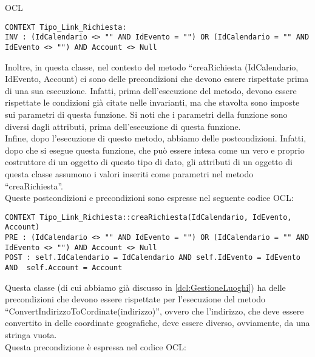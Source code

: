 \begin{listaPersonale}{OCL}
    \begin{lstlisting}
CONTEXT Tipo_Link_Richiesta:
INV : (IdCalendario <> "" AND IdEvento = "") OR (IdCalendario = "" AND IdEvento <> "") AND Account <> Null
    \end{lstlisting}
    Inoltre, in questa classe, nel contesto del metodo “creaRichiesta (IdCalendario, IdEvento, Account) ci sono delle precondizioni che devono essere rispettate prima di una sua esecuzione. Infatti, prima dell’esecuzione del metodo, devono essere rispettate le condizioni già citate nelle invarianti, ma che stavolta sono imposte sui parametri di questa funzione. Si noti che i parametri della funzione sono diversi dagli attributi, prima dell’esecuzione di questa funzione.\\
    Infine, dopo l’esecuzione di questo metodo, abbiamo delle postcondizioni. Infatti, dopo che si esegue questa funzione, che può essere intesa come un vero e proprio costruttore di un oggetto di questo tipo di dato, gli attributi di un oggetto di questa classe assumono i valori inseriti come parametri nel metodo “creaRichiesta”. \\
    Queste postcondizioni e precondizioni sono espresse nel seguente codice OCL:

    \begin{lstlisting}
CONTEXT Tipo_Link_Richiesta::creaRichiesta(IdCalendario, IdEvento, Account)
PRE : (IdCalendario <> "" AND IdEvento = "") OR (IdCalendario = "" AND IdEvento <> "") AND Account <> Null
POST : self.IdCalendario = IdCalendario AND self.IdEvento = IdEvento AND  self.Account = Account  
    \end{lstlisting}




    \begin{center}
        
    \end{center}
    Questa classe (di cui abbiamo già discusso in \ref{dcl:GestioneLuoghi}) ha delle precondizioni che devono essere rispettate per l’esecuzione del metodo “ConvertIndirizzoToCordinate(indirizzo)”, ovvero che l’indirizzo, che deve essere convertito in delle coordinate geografiche, deve essere diverso, ovviamente, da una stringa vuota.\\
    Questa precondizione è espressa nel codice OCL:


\end{listaPersonale}

